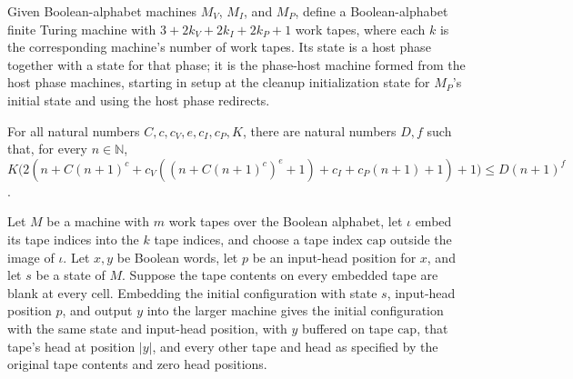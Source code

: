 \begin{definition}
\label{Complexity.b2b_host}
\leanok
{}
Given Boolean-alphabet machines $M_V$, $M_I$, and $M_P$, define a Boolean-alphabet
finite Turing machine with $3+2k_V+2k_I+2k_P+1$ work tapes, where each $k$ is the
corresponding machine's number of work tapes. Its state is a host phase together with a
state for that phase; it is the phase-host machine formed from the host phase machines,
starting in setup at the cleanup initialization state for $M_P$'s initial state and
using the host phase redirects.
\end{definition}

\begin{theorem}
\label{Complexity.b2b_ledger_bound}
\leanok
{}
For all natural numbers $C,c,c_V,e,c_I,c_P,K$, there are natural numbers $D,f$ such
that, for every $n\in\mathbb{N}$,
$K\bigl(2(n+C(n+1)^c+c_V((n+C(n+1)^c)^e+1)+c_I+c_P(n+1)+1)+1\bigr)\le D(n+1)^f$.
\end{theorem}

\begin{theorem}
\label{Complexity.b2b_capture_shape}
\leanok
{}
Let $M$ be a machine with $m$ work tapes over the Boolean alphabet, let $\iota$ embed
its tape indices into the $k$ tape indices, and choose a tape index $\mathrm{cap}$
outside the image of $\iota$. Let $x,y$ be Boolean words, let $p$ be an input-head
position for $x$, and let $s$ be a state of $M$. Suppose the tape contents on every
embedded tape are blank at every cell. Embedding the initial configuration with state
$s$, input-head position $p$, and output $y$ into the larger machine gives the initial
configuration with the same state and input-head position, with $y$ buffered on tape
$\mathrm{cap}$, that tape's head at position $|y|$, and every other tape and head as
specified by the original tape contents and zero head positions.
\end{theorem}

